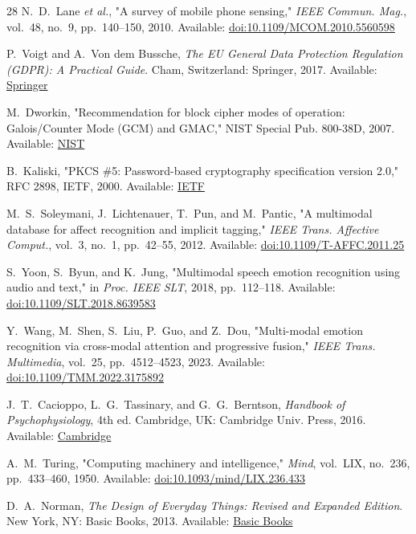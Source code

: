 \documentclass[journal,10pt,twocolumn]{IEEEtran}
\begin{document}
\begin{thebibliography}{28}
 N.~D.~Lane \textit{et al.}, "A survey of mobile phone sensing," \textit{IEEE Commun. Mag.}, vol.~48, no.~9, pp.~140--150, 2010. Available: \href{https://doi.org/10.1109/MCOM.2010.5560598}{doi:10.1109/MCOM.2010.5560598}

 P.~Voigt and A.~Von dem Bussche, \textit{The EU General Data Protection Regulation (GDPR): A Practical Guide}. Cham, Switzerland: Springer, 2017. Available: \href{https://doi.org/10.1007/978-3-319-57959-7}{Springer}

 M.~Dworkin, "Recommendation for block cipher modes of operation: Galois/Counter Mode (GCM) and GMAC," NIST Special Pub. 800-38D, 2007. Available: \href{https://doi.org/10.6028/NIST.SP.800-38D}{NIST}

 B.~Kaliski, "PKCS \#5: Password-based cryptography specification version 2.0," RFC 2898, IETF, 2000. Available: \href{https://doi.org/10.17487/RFC2898}{IETF}

 M.~S.~Soleymani, J.~Lichtenauer, T.~Pun, and M.~Pantic, "A multimodal database for affect recognition and implicit tagging," \textit{IEEE Trans. Affective Comput.}, vol.~3, no.~1, pp.~42--55, 2012. Available: \href{https://doi.org/10.1109/T-AFFC.2011.25}{doi:10.1109/T-AFFC.2011.25}

 S.~Yoon, S.~Byun, and K.~Jung, "Multimodal speech emotion recognition using audio and text," in \textit{Proc. IEEE SLT}, 2018, pp.~112--118. Available: \href{https://doi.org/10.1109/SLT.2018.8639583}{doi:10.1109/SLT.2018.8639583}

 Y.~Wang, M.~Shen, S.~Liu, P.~Guo, and Z.~Dou, "Multi-modal emotion recognition via cross-modal attention and progressive fusion," \textit{IEEE Trans. Multimedia}, vol.~25, pp.~4512--4523, 2023. Available: \href{https://doi.org/10.1109/TMM.2022.3175892}{doi:10.1109/TMM.2022.3175892}

 J.~T.~Cacioppo, L.~G.~Tassinary, and G.~G.~Berntson, \textit{Handbook of Psychophysiology}, 4th ed. Cambridge, UK: Cambridge Univ. Press, 2016. Available: \href{https://doi.org/10.1017/9781107415782}{Cambridge}

 A.~M.~Turing, "Computing machinery and intelligence," \textit{Mind}, vol.~LIX, no.~236, pp.~433--460, 1950. Available: \href{https://doi.org/10.1093/mind/LIX.236.433}{doi:10.1093/mind/LIX.236.433}

 D.~A.~Norman, \textit{The Design of Everyday Things: Revised and Expanded Edition}. New York, NY: Basic Books, 2013. Available: \href{https://www.basicbooks.com/titles/don-norman/the-design-of-everyday-things/9780465050659/}{Basic Books}
\end{thebibliography}
\end{document}
